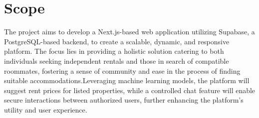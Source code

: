 \section{Scope}
The project aims to develop a Next.js-based web application utilizing Supabase, a PostgreSQL-based
backend, to create a scalable, dynamic, and responsive platform. The focus lies in providing a
holistic solution catering to both individuals seeking independent rentals and those in search
of compatible roommates, fostering a sense of community and ease in the process of finding suitable
accommodations.Leveraging machine learning models, the platform will suggest rent prices for listed
properties, while a controlled chat feature will enable secure interactions between authorized users,
further enhancing the platform's utility and user experience.
